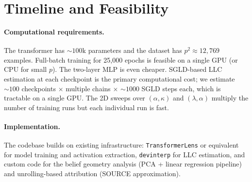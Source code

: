 \documentclass[11pt,a4paper]{article}
\begin{document}
\section{Timeline and Feasibility}

\paragraph{Computational requirements.} The transformer has ${\sim}100$k parameters and the dataset has $p^2 \approx 12{,}769$ examples. Full-batch training for 25,000 epochs is feasible on a single GPU (or CPU for small $p$). The two-layer MLP is even cheaper. SGLD-based LLC estimation at each checkpoint is the primary computational cost; we estimate ${\sim}100$ checkpoints $\times$ multiple chains $\times$ ${\sim}1000$ SGLD steps each, which is tractable on a single GPU. The 2D sweeps over $(\alpha, \kappa)$ and $(\lambda, \alpha)$ multiply the number of training runs but each individual run is fast.

\paragraph{Implementation.} The codebase builds on existing infrastructure: \texttt{TransformerLens} or equivalent for model training and activation extraction, \texttt{devinterp} for LLC estimation, and custom code for the belief geometry analysis (PCA + linear regression pipeline) and unrolling-based attribution (SOURCE approximation).
\end{document}
